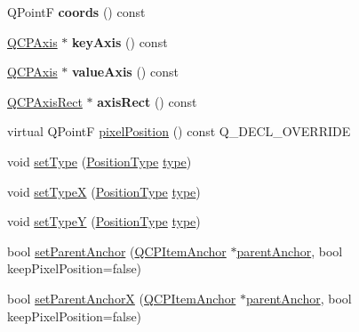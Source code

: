 \begin{DoxyCompactItemize}
\mbox{\label{classQCPItemPosition_aa4ecf5b04c67049c05d37619e090820b}} 
Q\+PointF {\bfseries coords} () const
\item 
\mbox{\label{classQCPItemPosition_a9ad34861fbfd8be8b8270c16f879169c}} 
\hyperlink{classQCPAxis}{Q\+C\+P\+Axis} $\ast$ {\bfseries key\+Axis} () const
\item 
\mbox{\label{classQCPItemPosition_a356ac94e7e73d88deb7f2841c0d0c734}} 
\hyperlink{classQCPAxis}{Q\+C\+P\+Axis} $\ast$ {\bfseries value\+Axis} () const
\item 
\mbox{\label{classQCPItemPosition_ae4081cfe7575f922f403c6e3a2ce7891}} 
\hyperlink{classQCPAxisRect}{Q\+C\+P\+Axis\+Rect} $\ast$ {\bfseries axis\+Rect} () const
\item 
virtual Q\+PointF \hyperlink{classQCPItemPosition_a8be9a4787635433edecc75164beb748d}{pixel\+Position} () const Q\+\_\+\+D\+E\+C\+L\+\_\+\+O\+V\+E\+R\+R\+I\+DE
\item 
void \hyperlink{classQCPItemPosition_aa476abf71ed8fa4c537457ebb1a754ad}{set\+Type} (\hyperlink{classQCPItemPosition_aad9936c22bf43e3d358552f6e86dbdc8}{Position\+Type} \hyperlink{classQCPItemPosition_abfd74d86bd799306ce0295ffe433bdfc}{type})
\item 
void \hyperlink{classQCPItemPosition_a2113b2351d6d00457fb3559a4e20c3ea}{set\+TypeX} (\hyperlink{classQCPItemPosition_aad9936c22bf43e3d358552f6e86dbdc8}{Position\+Type} \hyperlink{classQCPItemPosition_abfd74d86bd799306ce0295ffe433bdfc}{type})
\item 
void \hyperlink{classQCPItemPosition_ac2a454aa5a54c1615c50686601ec4510}{set\+TypeY} (\hyperlink{classQCPItemPosition_aad9936c22bf43e3d358552f6e86dbdc8}{Position\+Type} \hyperlink{classQCPItemPosition_abfd74d86bd799306ce0295ffe433bdfc}{type})
\item 
bool \hyperlink{classQCPItemPosition_ac094d67a95d2dceafa0d50b9db3a7e51}{set\+Parent\+Anchor} (\hyperlink{classQCPItemAnchor}{Q\+C\+P\+Item\+Anchor} $\ast$\hyperlink{classQCPItemPosition_a0a87f9dce1af6cc9b510785991bcf1c6}{parent\+Anchor}, bool keep\+Pixel\+Position=false)
\item 
bool \hyperlink{classQCPItemPosition_add71461a973927c74e42179480916d9c}{set\+Parent\+AnchorX} (\hyperlink{classQCPItemAnchor}{Q\+C\+P\+Item\+Anchor} $\ast$\hyperlink{classQCPItemPosition_a0a87f9dce1af6cc9b510785991bcf1c6}{parent\+Anchor}, bool keep\+Pixel\+Position=false)

\end{DoxyCompactItemize}
